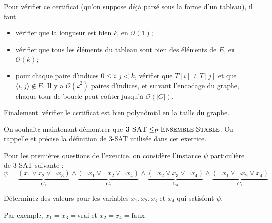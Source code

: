 \begin{exercice}
\begin{corrections}
    Pour vérifier ce certificat (qu'on suppose déjà parsé sous la forme d'un tableau), il faut
    \begin{itemize}
    \item vérifier que la longueur est bien $k$, en $\mathcal{O}(1)$; 
    \item vérifier que tous les éléments du tableau sont bien des éléments de $E$, en $\mathcal{O}(k)$; 
    \item pour chaque paire d'indices $0 \le i, j < k$, vérifier que $T[i] \neq T[j]$ et que $\langle i, j \rangle \notin E$.
      Il y a $\mathcal{O}(k^2)$ paires d'indices, et suivant l'encodage du graphe, chaque tour de boucle peut coûter jusqu'à  $\mathcal{O}(|G|)$. 
    \end{itemize}
    Finalement, vérifier le certificat est bien polynômial en la taille du graphe. 
  \end{corrections}

  On souhaite maintenant démontrer que $\textsc{3-SAT} \leq_P \textsc{Ensemble Stable}$. On rappelle et précise la définition de \textsc{3-SAT}
  utilisée dans cet exercice. 


  Pour les premières questions de l'exercice, on considère l'instance $\psi$ particulière de \textsc{3-SAT} suivante : 
  $$\psi =
  \underbrace{(x_1 \vee x_2 \vee \neg x_3)}_{C_1}
  \wedge
  \underbrace{(\neg x_1 \vee \neg x_2 \vee \neg x_4)}_{C_2}
  \wedge
  \underbrace{(\neg x_2 \vee x_3 \vee \neg x_4)}_{C_3}
  \wedge
  \underbrace{(\neg x_1 \vee \neg x_2 \vee x_4)}_{C_4}
  $$
  
  \ifcorrection{\newpage}
  \begin{questions}
  \item\label{ex3.Q1} Déterminez des valeurs pour les variables $x_1, x_2, x_3$ et $x_4$ qui satisfont $\psi$.
  \end{questions}
  \begin{corrections}
    Par exemple, $x_1 = x_3 = \text{vrai}$ et $x_2 = x_4 = \text{faux}$
  \end{corrections}
  

\end{exercice}
